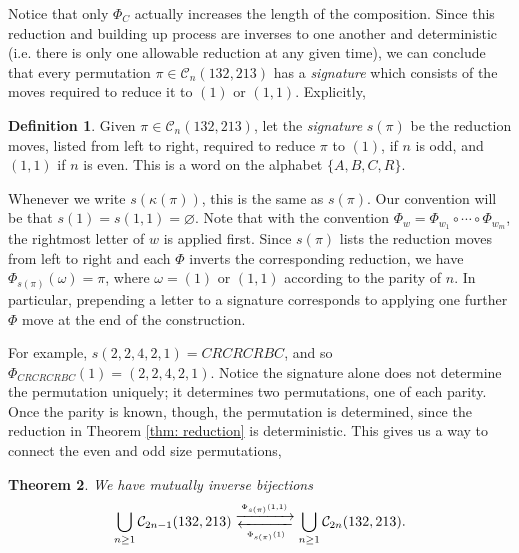 \documentclass[11pt]{article}
\newcommand\C{\mathcal C}
\newtheorem{theorem}{Theorem}[section]
\theoremstyle{definition}
\newtheorem{definition}[theorem]{Definition}
\begin{document}
Notice that only $\Phi_C$ actually increases the length of the composition. Since this reduction and building up process are inverses to one another and deterministic (i.e. there is only one allowable reduction at any given time), we can conclude that every permutation $\pi \in \C_n(132,213)$ has a \emph{signature} which consists of the moves required to reduce it to $(1)$ or $(1,1)$. Explicitly,

\begin{definition}
    Given $\pi \in \C_n(132,213)$, let the \emph{signature} $s(\pi)$ be the reduction moves, listed from left to right, required to reduce $\pi$ to $(1)$, if $n$ is odd, and $(1,1)$ if $n$ is even. This is a word on the alphabet $\{A,B,C,R\}$.
\end{definition}

Whenever we write $s(\kappa(\pi))$, this is the same as $s(\pi)$. Our convention will be that $s(1) = s(1,1) = \varnothing$. Note that with the convention $\Phi_w = \Phi_{w_1} \circ \cdots \circ \Phi_{w_m}$, the rightmost letter of $w$ is applied first. Since $s(\pi)$ lists the reduction moves from left to right and each $\Phi$ inverts the corresponding reduction, we have $\Phi_{s(\pi)}(\omega) = \pi$, where $\omega = (1)$ or $(1,1)$ according to the parity of $n$. In particular, prepending a letter to a signature corresponds to applying one further $\Phi$ move at the end of the construction.

For example, $s(2,2,4,2,1) = CRCRCRBC$, and so $\Phi_{CRCRCRBC}(1) = (2,2,4,2,1)$. Notice the signature alone does not determine the permutation uniquely; it determines two permutations, one of each parity. Once the parity is known, though, the permutation is determined, since the reduction in Theorem \ref{thm: reduction} is deterministic. This gives us a way to connect the even and odd size permutations,

 \begin{theorem} \label{thm: bijs-odd-even}
 We have mutually inverse bijections
  \[
     \bigcup_{n \ge 1} \C_{2n-1}(132,213)\mathrel{
    \substack{
    \xrightarrow{\Phi_{s(\pi)}(1,1)}\\
    \xleftarrow[\hspace{.2em} \Phi_{s(\pi)}(1) \hspace{.2em}]{}
    }
    } \bigcup_{n \ge 1} \C_{2n}(132,213).
     \]
\end{theorem}
\end{document}
